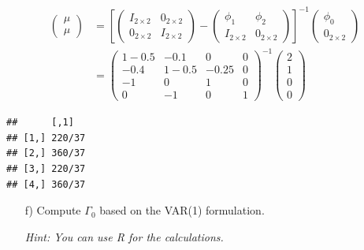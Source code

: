 \documentclass[12pt,a4paper]{article}
\newenvironment{Shaded}{\begin{snugshade}}{\end{snugshade}}
\newcommand{\CommentTok}[1]{\textcolor[rgb]{0.56,0.35,0.01}{\textit{#1}}}
\newcommand{\DecValTok}[1]{\textcolor[rgb]{0.00,0.00,0.81}{#1}}
\newcommand{\KeywordTok}[1]{\textcolor[rgb]{0.13,0.29,0.53}{\textbf{#1}}}
\newcommand{\NormalTok}[1]{#1}
\newcommand{\OperatorTok}[1]{\textcolor[rgb]{0.81,0.36,0.00}{\textbf{#1}}}
\newcommand{\StringTok}[1]{\textcolor[rgb]{0.31,0.60,0.02}{#1}}
\begin{document}
\begin{align*}
  \begin{pmatrix} \mu  \\ \mu \end{pmatrix} & = \left[  \begin{pmatrix} I_{2 \times 2} & 0_{2 \times 2}\\ 0_{2 \times 2} & I_{2 \times 2} \end{pmatrix} - \begin{pmatrix} \phi_1 & \phi_2 \\ I_{2 \times 2} & 0_{2 \times 2} \end{pmatrix} \right]^{-1} \begin{pmatrix} \phi_0 \\ 0_{2 \times 2} \end{pmatrix} \\
  & = \begin{pmatrix} 
  1-0.5 & -0.1 & 0 & 0 \\
  -0.4 & 1-0.5 & -0.25 & 0 \\
  -1 & 0 & 1 & 0 \\
  0 & -1 & 0 & 1 
  \end{pmatrix}^{-1}
  \begin{pmatrix} 
  2 \\ 1 \\ 0 \\ 0 
  \end{pmatrix}
\end{align*}

\begin{Shaded}
\end{Shaded}

\begin{verbatim}
##      [,1]  
## [1,] 220/37
## [2,] 360/37
## [3,] 220/37
## [4,] 360/37
\end{verbatim}

\begin{itemize}
    \item[f)] Compute $\Gamma_0$ based on the VAR(1) formulation.
    \item[] \textit{Hint: You can use R for the calculations.}
\end{itemize}
\end{document}
